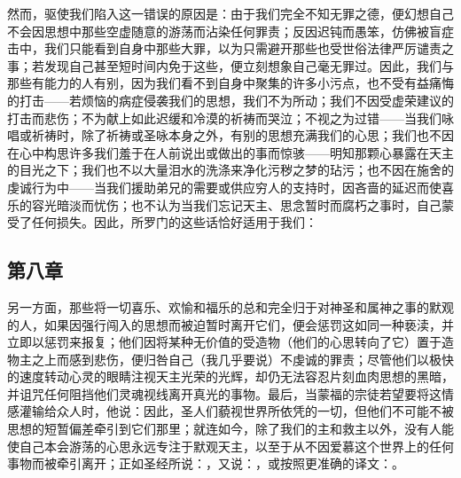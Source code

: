 然而，驱使我们陷入这一错误的原因是：由于我们完全不知无罪之德，便幻想自己不会因思想中那些空虚随意的游荡而沾染任何罪责；反因迟钝而愚笨，仿佛被盲症击中，我们只能看到自身中那些大罪，以为只需避开那些也受世俗法律严厉谴责之事；若发现自己甚至短时间内免于这些，便立刻想象自己毫无罪过。因此，我们与那些有能力的人有别，因为我们看不到自身中聚集的许多小污点，也不受有益痛悔的打击——若烦恼的病症侵袭我们的思想，我们不为所动；我们不因受虚荣建议的打击而悲伤；不为献上如此迟缓和冷漠的祈祷而哭泣；不视之为过错——当我们咏唱或祈祷时，除了祈祷或圣咏本身之外，有别的思想充满我们的心思；我们也不因在心中构思许多我们羞于在人前说出或做出的事而惊骇——明知那颗心暴露在天主的目光之下；我们也不以大量泪水的洗涤来净化污秽之梦的玷污；也不因在施舍的虔诚行为中——当我们援助弟兄的需要或供应穷人的支持时，因吝啬的延迟而使喜乐的容光暗淡而忧伤；也不认为当我们忘记天主、思念暂时而腐朽之事时，自己蒙受了任何损失。因此，所罗门的这些话恰好适用于我们：\par


\subsection{第八章}

\par

另一方面，那些将一切喜乐、欢愉和福乐的总和完全归于对神圣和属神之事的默观的人，如果因强行闯入的思想而被迫暂时离开它们，便会惩罚这如同一种亵渎，并立即以惩罚来报复；他们因将某种无价值的受造物（他们的心思转向了它）置于造物主之上而感到悲伤，便归咎自己（我几乎要说）不虔诚的罪责；尽管他们以极快的速度转动心灵的眼睛注视天主光荣的光辉，却仍无法容忍片刻血肉思想的黑暗，并诅咒任何阻挡他们灵魂视线离开真光的事物。最后，当蒙福的宗徒若望要将这情感灌输给众人时，他说：因此，圣人们藐视世界所依凭的一切，但他们不可能不被思想的短暂偏差牵引到它们那里；就连如今，除了我们的主和救主以外，没有人能使自己本会游荡的心思永远专注于默观天主，以至于从不因爱慕这个世界上的任何事物而被牵引离开；正如圣经所说：，又说：，或按照更准确的译文：。\par

